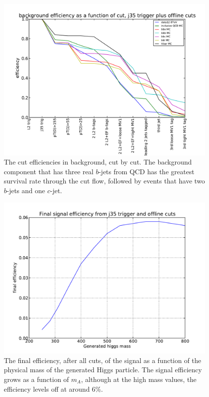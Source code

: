 \begin{figure}
    \center
	\includegraphics[width=0.98\textwidth]{TriggerCuts/cut_efficiencies_j35_background.pdf}	
    \caption{The cut efficiencies in background, cut by cut. The background component that has 
    three real $b$-jets from QCD has the greatest survival rate through the cut flow, followed
    by events that have two $b$-jets and one $c$-jet.\label{fig:background_eff_cutflow}}
\end{figure}


\begin{figure}
    \center
	\includegraphics[width=0.98\textwidth]{TriggerCuts/final_efficiency_vs_mass_j35.pdf}	
    \caption{The final efficiency, after all cuts, of the signal as a function of
    the physical mass of the generated Higgs particle.  The signal efficiency grows as a
    function of $m_A$, although at the high mass values, the efficiency levels off at around 6\%.\label{fig:final_eff_vs_mass}}
\end{figure}








